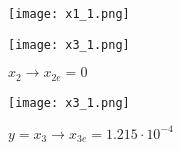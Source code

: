 \documentclass{article}
\begin{document}
\begin{figure}[!h]
   \begin{minipage}{0.5\textwidth}
     \centering
     \texttt{[image: x1\_1.png]}
     \caption*{$x_1\longrightarrow x_{1e}=3\cdot10^7$}
   \end{minipage}\hfill
    \begin{minipage}{0.5\textwidth}
     \centering
     \texttt{[image: x3\_1.png]}
     \caption*{$x_2\longrightarrow x_{2e}=0$}
   \end{minipage}\hfill
\end{figure}

\begin{figure}[!h]
    \centering
     \texttt{[image: x3\_1.png]}
     \caption*{$y=x_3\longrightarrow x_{3e}=1.215\cdot10^{-4}$}
     \end{figure}
\end{document}
